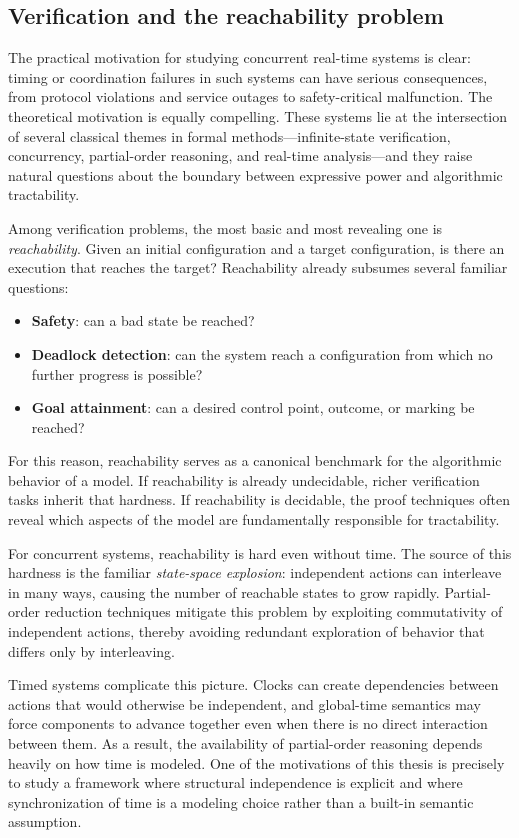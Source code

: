 \subsection{Verification and the reachability problem}

The practical motivation for studying concurrent real-time systems is clear: timing or coordination failures in such systems can have serious consequences, from protocol violations and service outages to safety-critical malfunction. The theoretical motivation is equally compelling. These systems lie at the intersection of several classical themes in formal methods---infinite-state verification, concurrency, partial-order reasoning, and real-time analysis---and they raise natural questions about the boundary between expressive power and algorithmic tractability.

Among verification problems, the most basic and most revealing one is \emph{reachability}. Given an initial configuration and a target configuration, is there an execution that reaches the target? Reachability already subsumes several familiar questions:
\begin{itemize}
    \item \textbf{Safety}: can a bad state be reached?
    \item \textbf{Deadlock detection}: can the system reach a configuration from which no further progress is possible?
    \item \textbf{Goal attainment}: can a desired control point, outcome, or marking be reached?
\end{itemize}
For this reason, reachability serves as a canonical benchmark for the algorithmic behavior of a model. If reachability is already undecidable, richer verification tasks inherit that hardness. If reachability is decidable, the proof techniques often reveal which aspects of the model are fundamentally responsible for tractability.

For concurrent systems, reachability is hard even without time. The source of this hardness is the familiar \emph{state-space explosion}: independent actions can interleave in many ways, causing the number of reachable states to grow rapidly. Partial-order reduction techniques mitigate this problem by exploiting commutativity of independent actions, thereby avoiding redundant exploration of behavior that differs only by interleaving.

Timed systems complicate this picture. Clocks can create dependencies between actions that would otherwise be independent, and global-time semantics may force components to advance together even when there is no direct interaction between them. As a result, the availability of partial-order reasoning depends heavily on how time is modeled. One of the motivations of this thesis is precisely to study a framework where structural independence is explicit and where synchronization of time is a modeling choice rather than a built-in semantic assumption.

